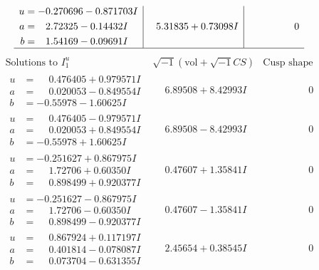 \documentclass[1p]{elsarticle_modified}
\theoremstyle{definition}
\newcommand{\I}{\sqrt{-1}}
\begin{document}
$$\begin{array}{c|c|c}
\begin{aligned}
u &= -0.270696 - 0.871703 I \\
a &= \phantom{-}2.72325 - 0.14432 I \\
b &= \phantom{-}1.54169 - 0.09691 I\end{aligned}
 & \phantom{-}5.31835 + 0.73098 I & \phantom{-0.000000 } 0\\
 \hline 
 \end{array}$$\newpage$$\begin{array}{c|c|c}  
\text{Solutions to }I^u_{1}& \I (\text{vol} + \sqrt{-1}CS) & \text{Cusp shape}\\
 \hline 
\begin{aligned}
u &= \phantom{-}0.476405 + 0.979571 I \\
a &= \phantom{-}0.020053 - 0.849554 I \\
b &= -0.55978 - 1.60625 I\end{aligned}
 & \phantom{-}6.89508 + 8.42993 I & \phantom{-0.000000 } 0 \\ \hline\begin{aligned}
u &= \phantom{-}0.476405 - 0.979571 I \\
a &= \phantom{-}0.020053 + 0.849554 I \\
b &= -0.55978 + 1.60625 I\end{aligned}
 & \phantom{-}6.89508 - 8.42993 I & \phantom{-0.000000 } 0 \\ \hline\begin{aligned}
u &= -0.251627 + 0.867975 I \\
a &= \phantom{-}1.72706 + 0.60350 I \\
b &= \phantom{-}0.898499 + 0.920377 I\end{aligned}
 & \phantom{-}0.47607 + 1.35841 I & \phantom{-0.000000 } 0 \\ \hline\begin{aligned}
u &= -0.251627 - 0.867975 I \\
a &= \phantom{-}1.72706 - 0.60350 I \\
b &= \phantom{-}0.898499 - 0.920377 I\end{aligned}
 & \phantom{-}0.47607 - 1.35841 I & \phantom{-0.000000 } 0 \\ \hline\begin{aligned}
u &= \phantom{-}0.867924 + 0.117197 I \\
a &= \phantom{-}0.401814 - 0.078087 I \\
b &= \phantom{-}0.073704 - 0.631355 I\end{aligned}
 & \phantom{-}2.45654 + 0.38545 I & \phantom{-0.000000 } 0 \\ \hline\begin{aligned}

\end{aligned}
\end{array}$$
\end{document}
